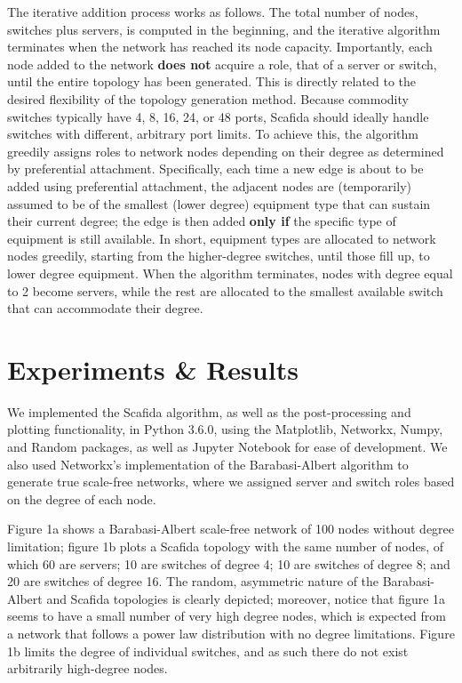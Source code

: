 The iterative addition process works as follows. The total number of nodes, switches plus servers, is computed in the beginning, and the iterative algorithm terminates when the network has reached its node capacity. Importantly, each node added to the network \textbf{does not} acquire a role, that of a server or switch, until the entire topology has been generated. This is directly related to the desired flexibility of the topology generation method. Because commodity switches typically have 4, 8, 16, 24, or 48 ports, Scafida should ideally handle switches with different, arbitrary port limits. To achieve this, the algorithm greedily assigns roles to network nodes depending on their degree as determined by preferential attachment. Specifically, each time a new edge is about to be added using preferential attachment, the adjacent nodes are (temporarily) assumed to be of the smallest (lower degree) equipment type that can sustain their current degree; the edge is then added \textbf{only if} the specific type of equipment is still available. In short, equipment types are allocated to network nodes greedily, starting from the higher-degree switches, until those fill up, to lower degree equipment. When the algorithm terminates, nodes with degree equal to 2 become servers, while the rest are allocated to the smallest available switch that can accommodate their degree.

\section{Experiments \& Results}

We implemented the Scafida algorithm, as well as the post-processing and plotting functionality, in Python 3.6.0, using the Matplotlib, Networkx, Numpy, and Random packages, as well as Jupyter Notebook for ease of development. We also used Networkx's implementation of the Barabasi-Albert algorithm to generate true scale-free networks, where we assigned server and switch roles based on the degree of each node.

Figure 1a shows a Barabasi-Albert scale-free network of 100 nodes without degree limitation; figure 1b plots a Scafida topology with the same number of nodes, of which 60 are servers; 10 are switches of degree 4; 10 are switches of degree 8;  and 20 are switches of degree 16. The random, asymmetric nature of the Barabasi-Albert and Scafida topologies is clearly depicted; moreover, notice that figure 1a seems to have a small number of very high degree nodes, which is expected from a network that follows a power law distribution with no degree limitations. Figure 1b limits the degree of individual switches, and as such there do not exist arbitrarily high-degree nodes.

